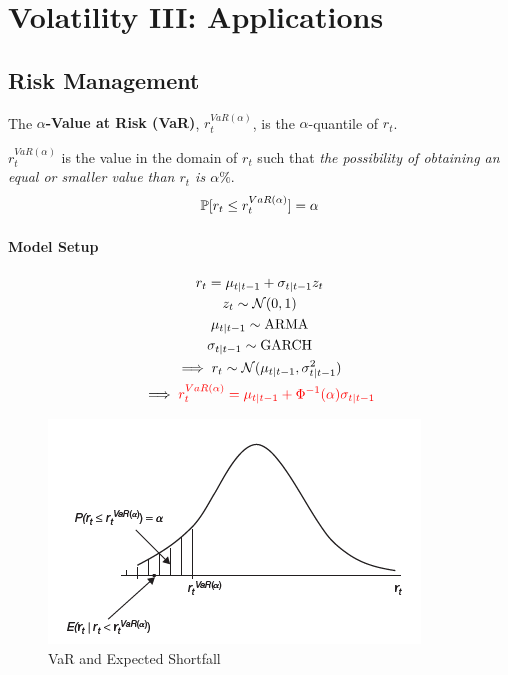 \documentclass[11pt]{article}
\begin{document}
	
	\section{Volatility III: Applications}
		\subsection{Risk Management}
			\begin{definition}
				The \textbf{$\alpha$-Value at Risk (VaR)}, $r_t^{VaR(\alpha)}$, is the $\alpha$-quantile of $r_t$.
			\end{definition}
			
			\begin{remark}[Interpretation]
				$r_t^{VaR(\alpha)}$ is the value in the domain of $r_t$ such that \emph{the possibility of obtaining an equal or smaller value than $r_t$ is $\alpha \%$}.
				\begin{equation}
					\mathbb{P}[{r_t \leq r_t^{VaR(\alpha)}}] = \alpha
				\end{equation}
			\end{remark}
	
			\paragraph{Model Setup}
				\begin{gather}
					r_t = \mu_{t|t-1} + \sigma_{t|t-1}z_t \\
					z_t \sim \mathcal{{N}}(0, 1) \\
					\mu_{t|t-1} \sim \text{{ARMA}} \\
					\sigma_{t|t-1} \sim \text{{GARCH}} \\
					\implies r_t \sim \mathcal{{N}}(\mu_{t|t-1}, \sigma_{t|t-1}^2) \\
					\implies \textcolor{red}{r_t^{VaR(\alpha)} = \mu_{t|t-1} + \Phi^{-1}(\alpha) \sigma_{t|t-1}}
				\end{gather}
				
			\begin{figure}[h]
				\centering
				\includegraphics[width=0.7\linewidth]{figures/lec12.png}
				\caption{VaR and Expected Shortfall}
			\end{figure}
			
\end{document}
